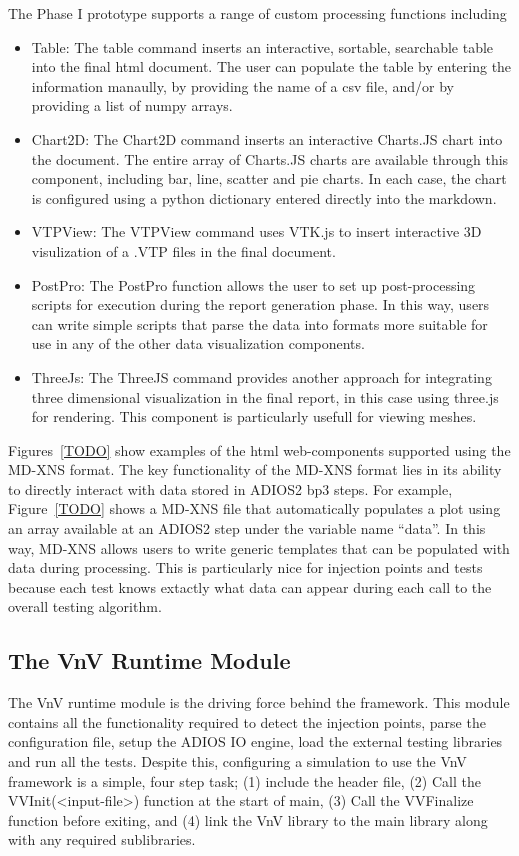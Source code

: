 The Phase I prototype supports a range of custom processing functions including 
\begin{itemize}
\item Table: The table command inserts an interactive, sortable, searchable table into the final html document. The user can populate the table by entering the information
manaully, by providing the name of a csv file, and/or by providing a list of numpy arrays. 
\item Chart2D: The Chart2D command inserts an interactive Charts.JS chart into the document. The entire array of Charts.JS charts are available through this component, including bar, 
line, scatter and pie charts. In each case, the chart is configured using a python dictionary entered directly into the markdown. 
\item VTPView: The VTPView command uses VTK.js to insert interactive 3D visulization of a .VTP files in the final document. 
\item PostPro: The PostPro function allows the user to set up post-processing scripts for execution during the report generation phase. In this way,
users can write simple scripts that parse the data into formats more suitable for use in any of the other data visualization components. 
\item ThreeJs: The ThreeJS command provides another approach for integrating three dimensional visualization in the final report, in this case using three.js for rendering. This 
component is particularly usefull for viewing meshes. 
\end{itemize}

Figures~\ref{TODO} show examples of the html web-components supported using the MD-XNS format. The key functionality of the MD-XNS format lies in its ability to directly interact with data stored in ADIOS2 bp3 steps. For example, Figure~\ref{TODO} shows a MD-XNS file that automatically populates a plot using an array available at an ADIOS2 step under the variable name ``data''. In this way, MD-XNS allows users to write generic templates that can be populated with data during processing. This is particularly nice for \VV injection points and \VV tests because each test knows extactly what data can appear during each call to the overall testing algorithm. 


\subsection{The VnV Runtime Module}

The VnV runtime module is the driving force behind the framework. This module contains all the functionality required  to detect the injection points, parse the
configuration file, setup the ADIOS IO engine, load the external testing libraries and run all the tests. Despite this, configuring a simulation to use the VnV 
framework is a simple, four step task; (1) include the header file, (2) Call the VVInit(<input-file>) function at the start of main, (3) Call the VVFinalize function
before exiting, and (4) link the VnV library to the main library along with any required sublibraries. 


